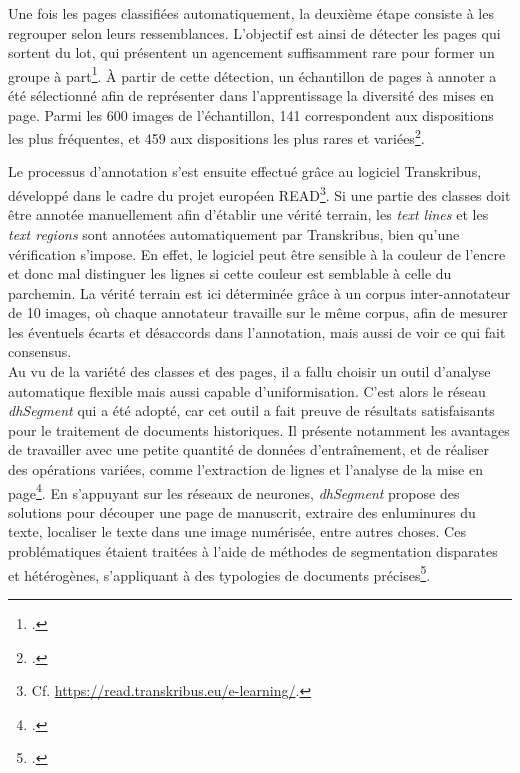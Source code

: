 \documentclass[a4paper,12pt,twoside]{book}
\begin{document}
    Une fois les pages classifiées automatiquement, la deuxième étape consiste à les regrouper selon leurs ressemblances. L'objectif est ainsi de détecter les pages qui sortent du lot, qui présentent un agencement suffisamment rare pour former un groupe à part\footcite[p. 8]{annotated_dataset_book_hours}. À partir de cette détection, un échantillon de pages à annoter a été sélectionné afin de représenter dans l'apprentissage la diversité des mises en page. Parmi les 600 images de l'échantillon, 141 correspondent aux dispositions les plus fréquentes, et 459 aux dispositions les plus rares et variées\footcite[p. 8]{annotated_dataset_book_hours}. 
    
    Le processus d'annotation s'est ensuite effectué grâce au logiciel Transkribus, développé dans le cadre du projet européen READ\footnote{Cf. \url{https://read.transkribus.eu/e-learning/}.}. Si une partie des classes doit être annotée manuellement afin d'établir une vérité terrain, les \textit{text lines} et les \textit{text regions} sont annotées automatiquement par Transkribus, bien qu'une vérification s'impose. En effet, le logiciel peut être sensible à la couleur de l’encre et donc mal distinguer les lignes si cette couleur est semblable à celle du parchemin. La vérité terrain est ici déterminée grâce à un corpus inter-annotateur de 10 images, où chaque annotateur travaille sur le même corpus, afin de mesurer les éventuels écarts et désaccords dans l'annotation, mais aussi de voir ce qui fait consensus. \\
    
    Au vu de la variété des classes et des pages, il a fallu choisir un outil d'analyse automatique flexible mais aussi capable d'uniformisation. C'est alors le réseau \textit{dhSegment} qui a été adopté, car cet outil a fait preuve de résultats satisfaisants pour le traitement de documents historiques. Il présente notamment les avantages de travailler avec une petite quantité de données d'entraînement, et de réaliser des opérations variées, comme l'extraction de lignes et l'analyse de la mise en page\footcite[p. 9]{annotated_dataset_book_hours}. En s'appuyant sur les réseaux de neurones, \textit{dhSegment} propose des solutions pour découper une page de manuscrit, extraire des enluminures du texte, localiser le texte dans une image numérisée, entre autres choses. Ces problématiques étaient traitées à l'aide de méthodes de segmentation disparates et hétérogènes, s'appliquant à des typologies de documents précises\footcite[p. 1]{deep_learning_segmentation}. 
    
\end{document}
